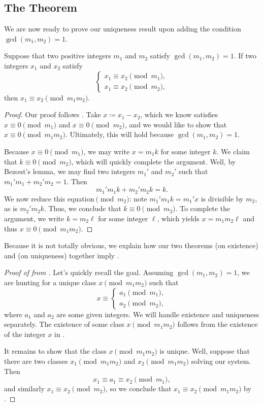 \documentclass{article}
\begin{document}
\subsection{The Theorem}
We are now ready to prove our uniqueness result upon adding the condition $\gcd(m_1,m_2)=1$.
\begin{theorem} \label{thm:crt-uniq}
	Suppose that two positive integers $m_1$ and $m_2$ satisfy $\gcd(m_1,m_2)=1$. If two integers $x_1$ and $x_2$ satisfy
	\[\begin{cases}
		x_1 \equiv x_2\pmod{m_1}, \\
		x_1 \equiv x_2\pmod{m_2},
	\end{cases}\]
	then $x_1\equiv x_2\pmod{m_1m_2}$.
\end{theorem}
\begin{proof}
	Our proof follows . Take $x\coloneqq x_1-x_2$, which we know satisfies $x\equiv0\pmod{m_1}$ and $x\equiv0\pmod{m_2}$, and we would like to show that $x\equiv0\pmod{m_1m_2}$. Ultimately, this will hold because $\gcd(m_1,m_2)=1$.

	Because $x\equiv0\pmod{m_1}$, we may write $x=m_1k$ for some integer $k$. We claim that $k\equiv0\pmod{m_2}$, which will quickly complete the argument. Well, by Bezout's lemma, we may find two integers $m_1'$ and $m_2'$ such that $m_1'm_1+m_2'm_2=1$. Then
	\[m_1'm_1k+m_2'm_2k=k.\]
	We now reduce this equation$\pmod{m_2}$: note $m_1'm_1k=m_1'x$ is divisible by $m_2$, as is $m_2'm_2k$. Thus, we conclude that $k\equiv0\pmod{m_2}$. To complete the argument, we write $k=m_2\ell$ for some integer $\ell$, which yields $x=m_1m_2\ell$ and thus $x\equiv0\pmod{m_1m_2}$.
\end{proof}
Because it is not totally obvious, we explain how our two theorems  (on existence) and  (on uniqueness) together imply .
\begin{proof}[Proof of  from ]
	Let's quickly recall the goal. Assuming $\gcd(m_1,m_2)=1$, we are hunting for a unique class $x\pmod{m_1m_2}$ such that
	\[x\equiv\begin{cases}
		a_1\pmod{m_1}, \\
		a_2\pmod{m_2},
	\end{cases}\]
	where $a_1$ and $a_2$ are some given integers. We will handle existence and uniqueness separately. The existence of some class $x\pmod{m_1m_2}$ follows from the existence of the integer $x$ in .
	
	It remains to show that the class $x\pmod{m_1m_2}$ is unique. Well, suppose that there are two classes $x_1\pmod{m_1m_2}$ and $x_2\pmod{m_1m_2}$ solving our system. Then
	\[x_1\equiv a_1\equiv x_2\pmod{m_1},\]
	and similarly $x_1\equiv x_2\pmod{m_2}$, so we conclude that $x_1\equiv x_2\pmod{m_1m_2}$ by .
\end{proof}
\end{document}
